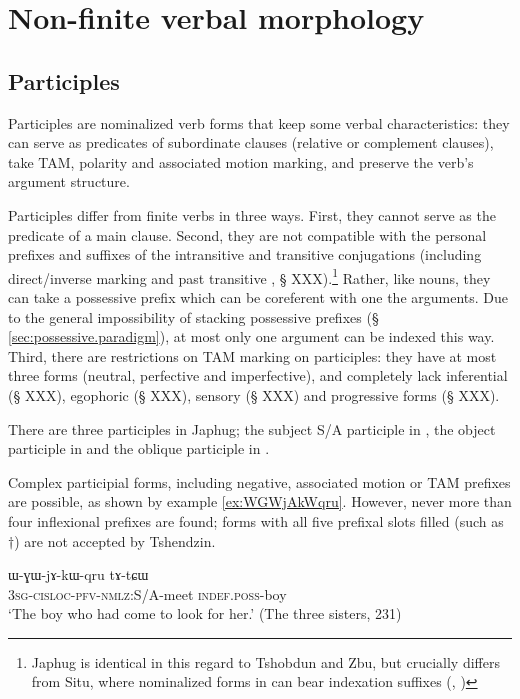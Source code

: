 \chapter{Non-finite verbal morphology}

\section{Participles}
Participles are nominalized verb forms that keep some verbal characteristics: they can serve as predicates of subordinate clauses (relative or complement clauses), take TAM, polarity and associated motion marking, and preserve the verb's argument structure.

Participles differ from finite verbs in three ways. First, they cannot serve as the predicate of a main clause. Second, they are not compatible with the personal prefixes and suffixes of the intransitive and transitive conjugations (including direct/inverse marking and past transitive , § XXX).\footnote{Japhug is identical in this regard to Tshobdun and Zbu, but crucially differs from Situ, where nominalized forms in  can bear indexation suffixes (\citet{jackson06guanxiju}, \citet{jacksonlin07}) } Rather, like nouns, they can take a possessive prefix which can be coreferent with one the arguments. Due to the general impossibility of stacking possessive prefixes (§ \ref{sec:possessive.paradigm}), at most only one argument can be indexed this way. Third, there are restrictions on TAM marking on participles: they have at most three forms (neutral, perfective and imperfective), and completely lack inferential (§ XXX), egophoric (§ XXX), sensory (§ XXX) and progressive forms (§ XXX).

There are three participles in Japhug; the subject S/A participle in , the object participle in  and the oblique participle in . 

Complex participial forms, including negative, associated motion or TAM prefixes are possible, as shown by example \ref{ex:WGWjAkWqru}. However, never more than four inflexional prefixes are found; forms with all five prefixal slots filled (such as $\dagger$) are not accepted by Tshendzin.

 \begin{exe}
\ex \label{ex:WGWjAkWqru}
\gll ɯ-ɣɯ-jɤ-kɯ-qru tɤ-tɕɯ  \\
  \textsc{3sg}-\textsc{cisloc}-\textsc{pfv}-\textsc{nmlz}:S/A-meet \textsc{indef}.\textsc{poss}-boy   \\
\glt `The boy who had come to look for her.' (The three sisters, 231)
 \end{exe}

